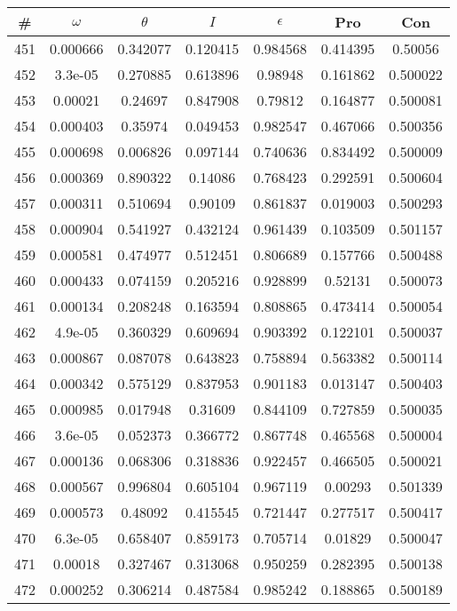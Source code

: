 \newpage
\begin{table}
\begin{tabular}{c|c|c|c|c|c|c}
\# & $\omega$ & $\theta$ & $I$ & $\epsilon$ & Pro & Con\\
\hline
451 & 0.000666 & 0.342077 & 0.120415 & 0.984568 & 0.414395 & 0.50056\\
452 & 3.3e-05 & 0.270885 & 0.613896 & 0.98948 & 0.161862 & 0.500022\\
453 & 0.00021 & 0.24697 & 0.847908 & 0.79812 & 0.164877 & 0.500081\\
454 & 0.000403 & 0.35974 & 0.049453 & 0.982547 & 0.467066 & 0.500356\\
455 & 0.000698 & 0.006826 & 0.097144 & 0.740636 & 0.834492 & 0.500009\\
456 & 0.000369 & 0.890322 & 0.14086 & 0.768423 & 0.292591 & 0.500604\\
457 & 0.000311 & 0.510694 & 0.90109 & 0.861837 & 0.019003 & 0.500293\\
458 & 0.000904 & 0.541927 & 0.432124 & 0.961439 & 0.103509 & 0.501157\\
459 & 0.000581 & 0.474977 & 0.512451 & 0.806689 & 0.157766 & 0.500488\\
460 & 0.000433 & 0.074159 & 0.205216 & 0.928899 & 0.52131 & 0.500073\\
461 & 0.000134 & 0.208248 & 0.163594 & 0.808865 & 0.473414 & 0.500054\\
462 & 4.9e-05 & 0.360329 & 0.609694 & 0.903392 & 0.122101 & 0.500037\\
463 & 0.000867 & 0.087078 & 0.643823 & 0.758894 & 0.563382 & 0.500114\\
464 & 0.000342 & 0.575129 & 0.837953 & 0.901183 & 0.013147 & 0.500403\\
465 & 0.000985 & 0.017948 & 0.31609 & 0.844109 & 0.727859 & 0.500035\\
466 & 3.6e-05 & 0.052373 & 0.366772 & 0.867748 & 0.465568 & 0.500004\\
467 & 0.000136 & 0.068306 & 0.318836 & 0.922457 & 0.466505 & 0.500021\\
468 & 0.000567 & 0.996804 & 0.605104 & 0.967119 & 0.00293 & 0.501339\\
469 & 0.000573 & 0.48092 & 0.415545 & 0.721447 & 0.277517 & 0.500417\\
470 & 6.3e-05 & 0.658407 & 0.859173 & 0.705714 & 0.01829 & 0.500047\\
471 & 0.00018 & 0.327467 & 0.313068 & 0.950259 & 0.282395 & 0.500138\\
472 & 0.000252 & 0.306214 & 0.487584 & 0.985242 & 0.188865 & 0.500189\\

\end{tabular}
\end{table}
